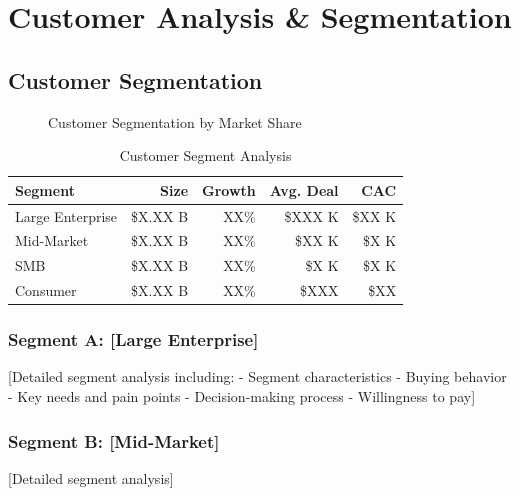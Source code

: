 \documentclass[11pt,letterpaper]{report}
\begin{document}
\chapter{Customer Analysis \& Segmentation}

\section{Customer Segmentation}


\begin{figure}[htbp]
\centering
\caption{Customer Segmentation by Market Share}
\label{fig:customer_segments}
\end{figure}

\begin{table}[htbp]
\centering
\caption{Customer Segment Analysis}
\begin{tabular}{@{}lrrrr@{}}
\toprule
\textbf{Segment} & \textbf{Size} & \textbf{Growth} & \textbf{Avg. Deal} & \textbf{CAC} \\
\midrule
Large Enterprise & \$X.XX B & XX\% & \$XXX K & \$XX K \\
\rowcolor{tablealt} Mid-Market & \$X.XX B & XX\% & \$XX K & \$X K \\
SMB & \$X.XX B & XX\% & \$X K & \$X K \\
\rowcolor{tablealt} Consumer & \$X.XX B & XX\% & \$XXX & \$XX \\
\bottomrule
\end{tabular}
\label{tab:customer_segments}
\end{table}

\subsection{Segment A: [Large Enterprise]}
[Detailed segment analysis including:
- Segment characteristics
- Buying behavior
- Key needs and pain points
- Decision-making process
- Willingness to pay]

\subsection{Segment B: [Mid-Market]}
[Detailed segment analysis]
\end{document}
